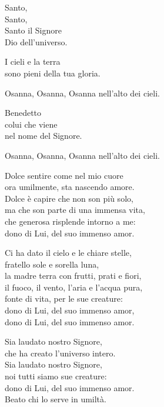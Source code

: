 \documentclass[11pt]{book}
\begin{document}
\settowidth{\versewidth}{Osanna, osanna, osanna nell'alto dei cieli.}
\begin{canzone}%
Santo,\\
Santo,\\
Santo il Signore\\
Dio dell'universo.

I cieli e la terra\\
sono pieni della tua gloria.

\begin{ritornello}
Osanna, Osanna, Osanna nell'alto dei cieli.
\end{ritornello}

Benedetto\\
colui che viene\\
nel nome del Signore.

\begin{ritornello}
Osanna, Osanna, Osanna nell'alto dei cieli.
\end{ritornello}

\end{canzone}



\vfill
\pagebreak
{}
\settowidth{\versewidth}{ma che son parte di una immensa vita,}
\begin{canzone}%
Dolce sentire come nel mio cuore\\
ora umilmente, sta nascendo amore.\\
Dolce è capire che non son più solo,\\
ma che son parte di una immensa vita,\\
che generosa risplende intorno a me:\\
dono di Lui, del suo immenso amor.

Ci ha dato il cielo e le chiare stelle,\\
fratello sole e sorella luna,\\
la madre terra con frutti, prati e fiori,\\
il fuoco, il vento, l'aria e l'acqua pura,\\
fonte di vita, per le sue creature:\\
dono di Lui, del suo immenso amor,\\
dono di Lui, del suo immenso amor.

Sia laudato nostro Signore,\\
che ha creato l'universo intero.\\
Sia laudato nostro Signore,\\
noi tutti siamo sue creature:\\
dono di Lui, del suo immenso amor.\\
Beato chi lo serve in umiltà.
\end{canzone}
\end{document}
